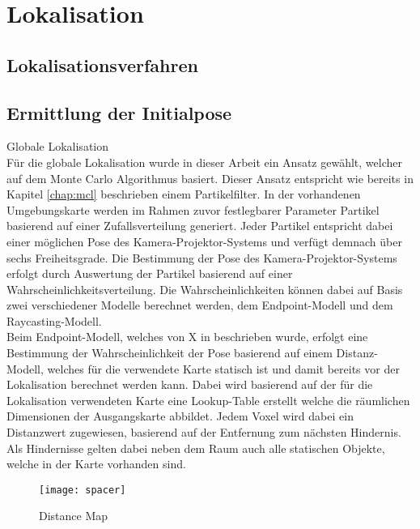 \chapter{Lokalisation}

\section{Lokalisationsverfahren}

\section{Ermittlung der Initialpose}
Globale Lokalisation\\
Für die globale Lokalisation wurde in dieser Arbeit ein Ansatz gewählt, welcher auf dem Monte Carlo Algorithmus basiert. Dieser Ansatz entspricht wie bereits in Kapitel \ref{chap:mcl} beschrieben einem Partikelfilter. In der vorhandenen Umgebungskarte werden im Rahmen zuvor festlegbarer Parameter Partikel basierend auf einer Zufallsverteilung generiert. Jeder Partikel entspricht dabei einer möglichen Pose des Kamera-Projektor-Systems und verfügt demnach über sechs Freiheitsgrade. Die Bestimmung der Pose des Kamera-Projektor-Systems erfolgt durch Auswertung der Partikel basierend auf einer Wahrscheinlichkeitsverteilung. Die Wahrscheinlichkeiten können dabei auf Basis zwei verschiedener Modelle berechnet werden, dem Endpoint-Modell und dem Raycasting-Modell.\\
Beim Endpoint-Modell, welches von X in \cite{Endpoint} beschrieben wurde, erfolgt eine Bestimmung der Wahrscheinlichkeit der Pose basierend auf einem Distanz-Modell, welches für die verwendete Karte statisch ist und damit bereits vor der Lokalisation berechnet werden kann. Dabei wird basierend auf der für die Lokalisation verwendeten Karte eine Lookup-Table erstellt welche die räumlichen Dimensionen der Ausgangskarte abbildet. Jedem Voxel wird dabei ein Distanzwert zugewiesen, basierend auf der Entfernung zum nächsten Hindernis. Als Hindernisse gelten dabei neben dem Raum auch alle statischen Objekte, welche in der Karte vorhanden sind.\\

\begin{figure}[!ht]
	\begin{center}
		\texttt{[image: spacer]}
		\caption{Distance Map}
		\label{fig.dist_map}
	\end{center}
\end{figure}

